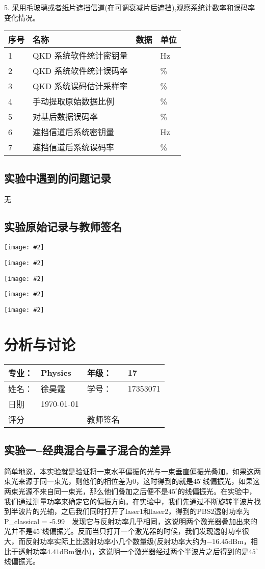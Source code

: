\documentclass[11pt,a4paper]{ctexart}
\newcommand{\cpic}[2]{
\begin{center}
\texttt{[image: \#2]}
\end{center}
}
\begin{document}
5. 采用毛玻璃或者纸片遮挡信道(在可调衰减片后遮挡),观察系统计数率和误码率
变化情况。
\begin{table}[H]
  \begin{center}
    \begin{tabular}{|l|l|p{7em}|l|}
      \hline
    序号 & 名称 & 数据& 单位\\\hline
    1 & QKD 系统软件统计密钥量 & & Hz\\\hline
    2 & QKD 系统软件统计误码率& & \%\\\hline
    3 & QKD 系统误码估计采样率& & \%\\\hline
    4 & 手动提取原始数据比例& & \%\\\hline
    5 & 对基后数据误码率& & \%\\\hline
    6 & 遮挡信道后系统密钥量 & & Hz\\\hline
    7& 遮挡信道后系统误码率 & & \% \\
    \hline
  \end{tabular}
  \end{center}
\end{table}

    
\subsection{实验中遇到的问题记录}
无
\subsection{实验原始记录与教师签名}
\cpic{0.3}{record1}
\cpic{0.3}{record2}
\cpic{0.3}{record3}
\cpic{0.3}{record4}
\cpic{0.3}{sign}
\newpage
\section{分析与讨论}
\begin{tabular}{|p{7em}|p{7em}|p{7em}|p{7em}|}
	\hline 
	专业：     &Physics       &年级：      & 17     \\
	\hline
	姓名：& 徐昊霆 &学号：&17353071  \\
	\hline
	日期&  \today              & &  \\
	\hline	
	评分 & & 教师签名 & \\
	\hline
\end{tabular}
\subsection{实验一--经典混合与量子混合的差异}
简单地说，本实验就是验证将一束水平偏振的光与一束垂直偏振光叠加，如果这两束光来源于同一束光，则他们的相位差为0，这时得到的就是$45^{\circ}$线偏振光，如果这两束光源不来自同一束光，那么他们叠加之后便不是$45^{\circ}$的线偏振光。在实验中，我们通过测量功率来确定它的偏振方向。在实验中，我们先通过不断旋转半波片找到半波片的光轴，之后我们同时打开了laser1和laser2，得到的PBS2透射功率为
\beq
P_{\rm classical} = -5.99  \,\, 
\eeq
发现它与反射功率几乎相同，这说明两个激光器叠加出来的光并不是$45^{\circ}$线偏振光。反而当只打开一个激光器的时候，我们发现透射功率很大，而反射功率实际上比透射功率小几个数量级(反射功率大约为$-16.45\mathrm{dBm}$，相比于透射功率$4.41\mathrm{dBm}$很小)，这说明一个激光器经过两个半波片之后得到的是$45^{\circ}$线偏振光。
\end{document}
